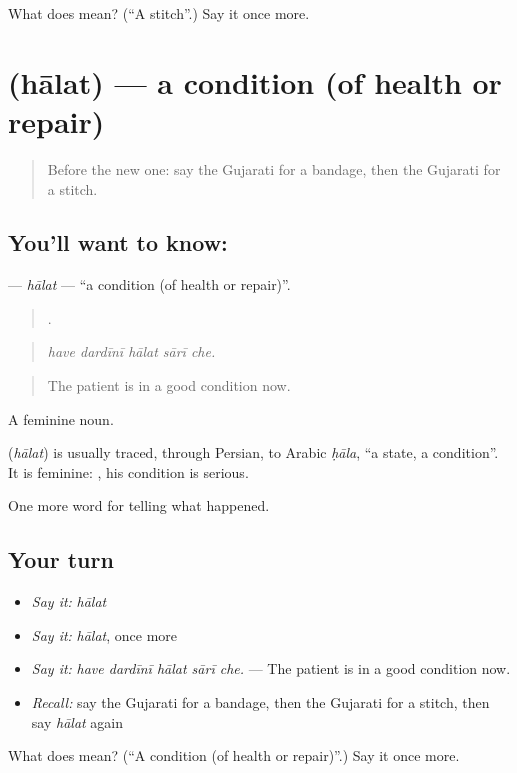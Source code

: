 \begin{tcolorbox}[breakable,colback=teal!4,colframe=teal!35!black,title={Before you move on}]
What does  mean? (\textquotedblleft{}A stitch\textquotedblright{}.) Say it once more.
\end{tcolorbox}
\section[\texorpdfstring{\gu{હાલત} (hālat)}{હાલત (hālat)}]{ (hālat) — a condition (of health or repair)}

\label{lesson:GU-C296-halat}



\begin{quote}
Before the new one: say the Gujarati for a bandage, then the Gujarati for a stitch.
\end{quote}

\subsection*{You'll want to know: }
\textbf{} — \emph{hālat} — \textquotedblleft{}a condition (of health or repair)\textquotedblright{}.

\begin{quote}
    .
\end{quote}

\begin{quote}
\emph{have dardīnī hālat sārī che.}
\end{quote}

\begin{quote}
The patient is in a good condition now.
\end{quote}

A feminine noun.

\begin{cousinweb}
\textbf{} (\emph{hālat}) is usually traced, through Persian, to Arabic \emph{ḥāla}, \textquotedblleft{}a state, a condition\textquotedblright{}. It is feminine: \textbf{   }, his condition is serious.
\end{cousinweb}

\begin{grammarlens}[title={What you've built}]
One more word for telling what happened.
\end{grammarlens}

\subsection*{Your turn}
\begin{itemize}
\raggedright
  \item \emph{Say it:} \emph{hālat}
  \item \emph{Say it:} \emph{hālat}, once more
  \item \emph{Say it:} \emph{have dardīnī hālat sārī che.} — The patient is in a good condition now.
  \item \emph{Recall:} say the Gujarati for a bandage, then the Gujarati for a stitch, then say \emph{hālat} again
\end{itemize}

\begin{tcolorbox}[breakable,colback=teal!4,colframe=teal!35!black,title={Before you move on}]
What does  mean? (\textquotedblleft{}A condition (of health or repair)\textquotedblright{}.) Say it once more.
\end{tcolorbox}
